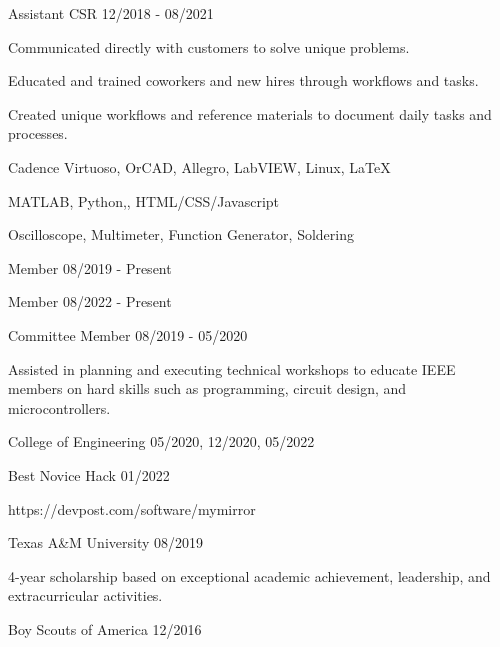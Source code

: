 \documentclass[11pt]{article}
\begin{document}
\begin{description}
\squish
{}
           {Assistant CSR}
           {12/2018 - 08/2021}

\textbullet \space Communicated directly with customers to solve unique problems.

\textbullet \space Educated and trained coworkers and new hires through workflows and tasks.

\textbullet \space Created unique workflows and reference materials to document daily tasks and processes.

\end{description}


      {Cadence Virtuoso, OrCAD, Allegro, LabVIEW, Linux, \LaTeX}

      {MATLAB, Python,\CPP, HTML/CSS/Javascript}

      {Oscilloscope, Multimeter, Function Generator, Soldering}


\begin{description}
\squish
{}
           {Member}
           {08/2019 - Present}

           {Member}
           {08/2022 - Present}

           {Committee Member}
           {08/2019 - 05/2020}

Assisted in planning and executing technical workshops to educate IEEE members on hard skills
such as programming, circuit design, and microcontrollers.

\end{description}


\begin{description}
\squish
{}
           {College of Engineering}
           {05/2020, 12/2020, 05/2022}

           {Best Novice Hack}
           {01/2022}

https://devpost.com/software/mymirror

           {Texas A\&M University}
           {08/2019}

4-year scholarship based on exceptional academic achievement, leadership, and extracurricular activities.

           {Boy Scouts of America}
           {12/2016}

\end{description}
\end{document}
